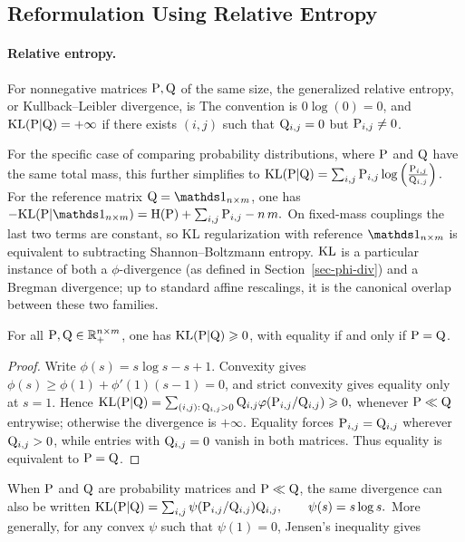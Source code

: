 \eql{\label{eq-sinkhorn}
\itt{\uD} \eqdef \frac{\a}{\K \it{\vD}}
\qandq
\itt{\vD} \eqdef \frac{\b}{\transp{\K}\itt{\uD}},
}
\subsection{Reformulation Using Relative Entropy}
\paragraph{Relative entropy.}
\begin{defn}\label{def-discrete-relative-entropy}
For nonnegative matrices $\P,\Q$ of the same size, the generalized relative entropy, or Kullback--Leibler divergence, is
The convention is $0\log(0)=0$, and $\KLD(\P|\Q)=+\infty$ if there exists $(i,j)$ such that $\Q_{i,j}=0$ but $\P_{i,j} \neq 0$.
\end{defn}
For the specific case of comparing probability distributions, where $\P$ and $\Q$ have the same total mass, this further simplifies to
\(\KLD(\P|\Q) = \sum_{i,j} \P_{i,j} \log\pa{\frac{\P_{i,j}}{\Q_{i,j}}}.\)
For the reference matrix $\Q=\ones_{n \times m}$, one has \(-\KLD(\P|\ones_{n \times m}) = \HD(\P)+\sum_{i,j}\P_{i,j}-n\,m.\)
On fixed-mass couplings the last two terms are constant, so KL regularization with reference $\ones_{n\times m}$ is equivalent to subtracting Shannon--Boltzmann entropy. $\KLD$ is a particular instance of both a $\phi$-divergence (as defined in Section~\ref{sec-phi-div}) and a Bregman divergence; up to standard affine rescalings, it is the canonical overlap between these two families.

\begin{prop}\label{prop-kl-distance-like}
For all $\P,\Q\in\RR_+^{n\times m}$, one has $\KLD(\P|\Q)\geq0$, with equality if and only if $\P=\Q$.
\end{prop}
\begin{proof}
Write $\phi(s)=s\log s-s+1$. Convexity gives $\phi(s)\geq \phi(1)+\phi'(1)(s-1)=0$, and strict convexity gives equality only at $s=1$. Hence
\(\KLD(\P|\Q)=\sum_{(i,j):\,\Q_{i,j}>0}\Q_{i,j} \phi(\P_{i,j}/\Q_{i,j})\geq0,\)
whenever $\P\ll\Q$ entrywise; otherwise the divergence is $+\infty$. Equality forces $\P_{i,j}=\Q_{i,j}$ wherever $\Q_{i,j}>0$, while entries with $\Q_{i,j}=0$ vanish in both matrices. Thus equality is equivalent to $\P=\Q$.
\end{proof}
When $\P$ and $\Q$ are probability matrices and $\P\ll\Q$, the same divergence can also be written
\(\KLD(\P|\Q) =\sum_{i,j}\psi(\P_{i,j}/\Q_{i,j})\Q_{i,j}, \qquad \psi(s)=s\log s.\)
More generally, for any convex $\psi$ such that $\psi(1)=0$, Jensen's inequality gives
